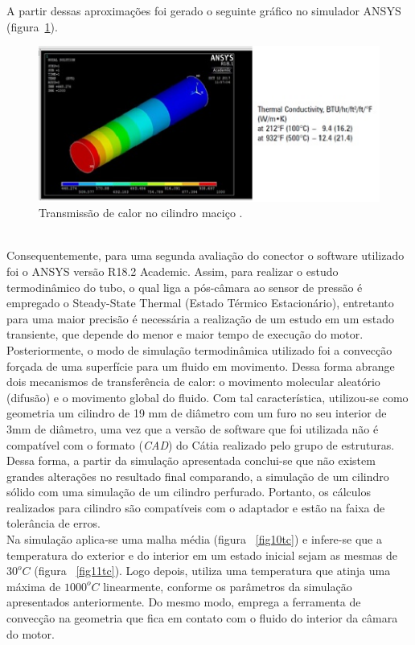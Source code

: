 A partir dessas aproximações foi gerado o seguinte gráfico no simulador ANSYS (figura~\ref{fig8tc}).
\begin{figure}[!htb]                  
	\centering                          
	\includegraphics[scale=1]{figuras/Figura8tc.eps}
	\caption{Transmissão de calor no cilindro maciço .} \label{fig8tc}              
\end{figure}
\\Consequentemente, para uma segunda avaliação do conector o software utilizado foi o ANSYS versão R18.2 Academic. Assim, para realizar o estudo termodinâmico do tubo, o qual liga a pós-câmara ao sensor de pressão é empregado o Steady-State Thermal (Estado Térmico Estacionário), entretanto para uma maior precisão é necessária a realização de um estudo em um estado transiente, que depende do menor e maior tempo de execução do motor.
Posteriormente, o modo de simulação termodinâmica utilizado foi a convecção forçada de uma superfície para um fluido em movimento. Dessa forma abrange dois mecanismos de transferência de calor: o movimento molecular aleatório (difusão) e o movimento global do fluido.  
Com tal característica, utilizou-se  como geometria um cilindro de 19 mm de diâmetro com um furo no seu interior de 3mm de diâmetro, uma vez que a versão de software que foi utilizada não é compatível com o formato (\emph{CAD}) do Cátia realizado pelo grupo de estruturas.\\
Dessa forma, a partir da simulação apresentada conclui-se que não existem grandes alterações no resultado final comparando, a simulação de um cilindro sólido com uma simulação de um cilindro perfurado. Portanto, os cálculos realizados para cilindro são compatíveis com o adaptador e estão na faixa de tolerância de erros.\\
Na simulação aplica-se uma malha média (figura ~\ref{fig10tc}) e infere-se que a temperatura do exterior e do interior em um estado inicial sejam as mesmas de $30^oC$ (figura ~\ref{fig11tc}). Logo depois, utiliza uma temperatura que atinja uma máxima de $1000^oC$ linearmente, conforme os parâmetros da simulação apresentados anteriormente. Do mesmo modo, emprega a ferramenta de convecção na geometria que fica em contato com o fluido do interior da câmara do motor.
